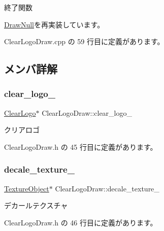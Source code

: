 終了関数 



\mbox{\hyperlink{class_draw_null_a12d44e341c7364b5ab9cdd661dc16187}{Draw\+Null}}を再実装しています。



 Clear\+Logo\+Draw.\+cpp の 59 行目に定義があります。



\subsection{メンバ詳解}
\mbox{\label{class_clear_logo_draw_a9cfe2a7655dbda11e6a9719943022327}} 
\subsubsection{\texorpdfstring{clear\+\_\+logo\+\_\+}{clear\_logo\_}}
{\footnotesize\ttfamily \mbox{\hyperlink{class_clear_logo}{Clear\+Logo}}$\ast$ Clear\+Logo\+Draw\+::clear\+\_\+logo\+\_\+\hspace{0.3cm}{\ttfamily [private]}}



クリアロゴ 



 Clear\+Logo\+Draw.\+h の 45 行目に定義があります。

\mbox{\label{class_clear_logo_draw_a4fdf733ac28fe6dd10e9899b808ddcf4}} 
\subsubsection{\texorpdfstring{decale\+\_\+texture\+\_\+}{decale\_texture\_}}
{\footnotesize\ttfamily \mbox{\hyperlink{class_texture_object}{Texture\+Object}}$\ast$ Clear\+Logo\+Draw\+::decale\+\_\+texture\+\_\+\hspace{0.3cm}{\ttfamily [private]}}



デカールテクスチャ 



 Clear\+Logo\+Draw.\+h の 46 行目に定義があります。


